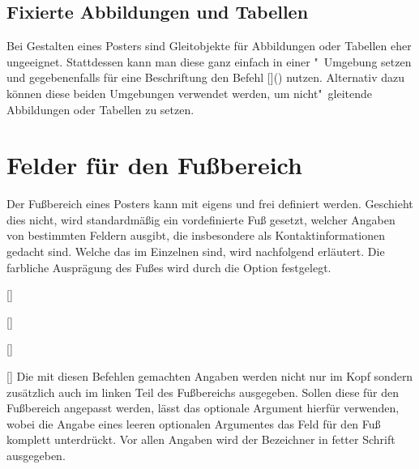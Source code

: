 \begin{DeclareEntity}{}
\subsection{Fixierte Abbildungen und Tabellen}
%
\begin{Declaration}
  [v2.07]
  {}
\begin{Declaration}
  [v2.07]
  {}
\printdeclarationlist
%
Bei Gestalten eines Posters sind Gleitobjekte für Abbildungen oder Tabellen 
eher ungeeignet. Stattdessen kann man diese ganz einfach in einer 
"~Umgebung setzen und gegebenenfalls für eine 
Beschriftung den Befehl
[]() 
nutzen. Alternativ dazu können diese beiden Umgebungen verwendet werden, um 
nicht"~gleitende Abbildungen oder Tabellen zu setzen.
\end{Declaration}
\end{Declaration}



\section{%
  Felder für den Fußbereich%
  \label{sec:poster:foot}%
}
%
Der Fußbereich eines Posters kann mit  eigens und frei 
definiert werden. Geschieht dies nicht, wird standardmäßig ein vordefinierte 
Fuß gesetzt, welcher Angaben von bestimmten Feldern ausgibt, die insbesondere 
als Kontaktinformationen gedacht sind. Welche das im Einzelnen sind, wird 
nachfolgend erläutert. Die farbliche Ausprägung des Fußes wird durch die Option
 festgelegt.

\begin{Declaration}
  {[]}
\begin{Declaration}
  {[]}
\begin{Declaration}
  {[]}
\begin{Declaration}
  {[]}
\printdeclarationlist
%
Die mit diesen Befehlen gemachten Angaben werden nicht nur im Kopf sondern 
zusätzlich auch im linken Teil des Fußbereichs ausgegeben. Sollen diese für den 
Fußbereich angepasst werden, lässt das optionale Argument hierfür verwenden, 
wobei die Angabe eines leeren optionalen Argumentes das Feld für den Fuß 
komplett unterdrückt. Vor allen Angaben wird der Bezeichner  
in fetter Schrift ausgegeben.
\end{Declaration}
\end{Declaration}
\end{Declaration}
\end{Declaration}



\end{DeclareEntity}
